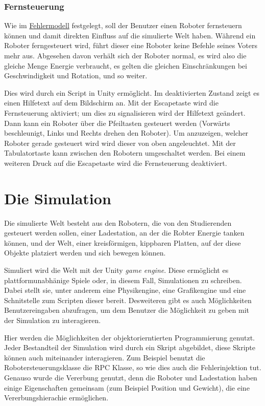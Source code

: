 \subsubsection{Fernsteuerung}
Wie im \hyperref[fm]{Fehlermodell} festgelegt, soll der Benutzer einen Roboter fernsteuern k{\"{o}}nnen
und damit direkten Einfluss auf die simulierte Welt haben. W{\"{a}}hrend ein Roboter ferngesteuert wird, 
f{\"{u}}hrt dieser eine Roboter keine Befehle seines Voters mehr aus. Abgesehen davon verh{\"{a}}lt sich der
Roboter normal, es wird also die gleiche Menge Energie verbraucht, es gelten die gleichen
Einschr{\"{a}}nkungen bei Geschwindigkeit und Rotation, und so weiter.

Dies wird durch ein Script in Unity erm{\"{o}}glicht. Im deaktivierten Zustand zeigt es einen Hilfetext
auf dem Bildschirm an. Mit der Escapetaste wird die Fernsteuerung aktiviert; um dies zu signalisieren wird
der Hilfetext ge{\"{a}}ndert. Dann kann ein Roboter {\"{u}}ber die Pfeiltasten gesteuert werden
(Vorw{\"{a}}rts beschleunigt, Links und Rechts drehen den Roboter). Um anzuzeigen, welcher Roboter
gerade gesteuert wird wird dieser von oben angeleuchtet. Mit der Tabulatortaste kann zwischen den
Robotern umgeschaltet werden. Bei einem weiteren Druck auf die Escapetaste wird die Fernsteuerung deaktiviert.


\clearpage
\section{Die Simulation}
Die simulierte Welt besteht aus den Robotern, die von den Studierenden gesteuert werden sollen, einer Ladestation, an der die Robter Energie tanken k{\"{o}}nnen, und
der Welt, einer kreisf{\"{o}}rmigen, kippbaren Platten, auf der diese Objekte platziert werden und sich bewegen k{\"{o}}nnen.

Simuliert wird die Welt mit der Unity \textit{game engine}. Diese erm{\"{o}}glicht es plattformunabh{\"{a}}nige 
Spiele oder, in diesem Fall, Simulationen zu schreiben. Dabei stellt sie, unter anderem eine Physikengine,
eine Grafikengine und eine Schnitstelle zum Scripten dieser bereit. Desweiteren gibt es auch M{\"{o}}glichkeiten Benutzereingaben
abzufragen, um dem Benutzer die M{\"{o}}glichkeit zu geben mit der Simulation zu interagieren.

Hier werden die M{\"{o}}glichkeiten der objektorierntierten Programmierung genutzt. Jeder Bestandteil der Simulation wird durch
ein Skript abgebildet, diese Skripte k{\"{o}}nnen auch miteinander interagieren. Zum Beispiel benutzt die Robotersteuerungsklasse
die RPC Klasse, so wie dies auch die Fehlerinjektion tut. Genauso wurde die Vererbung genutzt, denn die Roboter und Ladestation haben
einige Eigenschaften gemeinsam (zum Beispiel Position und Gewicht), die eine Vererbungshierachie erm{\"{o}}glichen.

